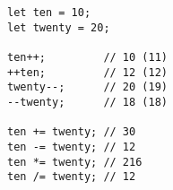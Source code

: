 \vspace{-2.25em}
\begin{center}
\begin{minipage}[t]{1\textwidth}
\begin{listing}[H]
\begin{spacing}{0.6}
\begin{verbatim}
let ten = 10;
let twenty = 20;

ten++;         // 10 (11)
++ten;         // 12 (12)
twenty--;      // 20 (19)
--twenty;      // 18 (18)

ten += twenty; // 30
ten -= twenty; // 12
ten *= twenty; // 216
ten /= twenty; // 12
\end{verbatim}
\end{spacing}
\end{listing}
\end{minipage}
\end{center}
